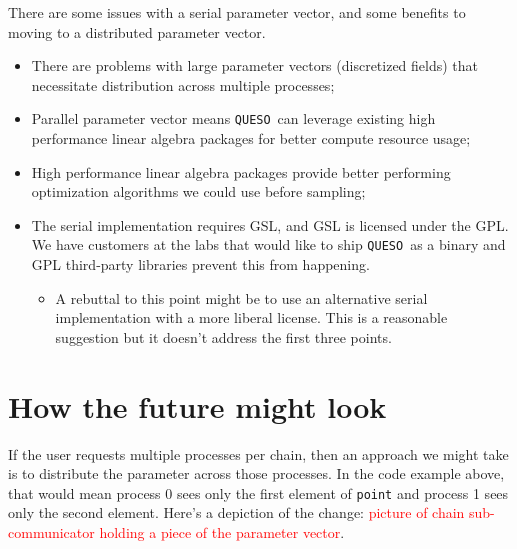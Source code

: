 \documentclass{article}
\newcommand{\Queso}{\texttt{QUESO}}
\begin{document}
There are some issues with a serial parameter vector, and some benefits to
moving to a distributed parameter vector.
\begin{itemize}
  \item There are problems with large parameter vectors (discretized fields)
    that necessitate distribution across multiple processes;
  \item Parallel parameter vector means \Queso\ can leverage existing high
    performance linear algebra packages for better compute resource usage;
  \item High performance linear algebra packages provide better performing
    optimization algorithms we could use before sampling;
  \item The serial implementation requires GSL, and GSL is licensed under the
    GPL.  We have customers at the labs that would like to ship \Queso\ as a
    binary and GPL third-party libraries prevent this from happening.
    \begin{itemize}
      \item A rebuttal to this point might be to use an alternative serial
        implementation with a more liberal license.  This is a reasonable
        suggestion but it doesn't address the first three points.
    \end{itemize}
\end{itemize}

\section{How the future might look}

If the user requests multiple processes per chain, then an approach we might
take is to distribute the parameter across those processes.  In the code
example above, that would mean process 0 sees only the first element of
\lstinline|point| and process 1 sees only the second element.  Here's a
depiction of the change: \textcolor{red}{picture of chain sub-communicator
holding a piece of the parameter vector}.

\end{document}
